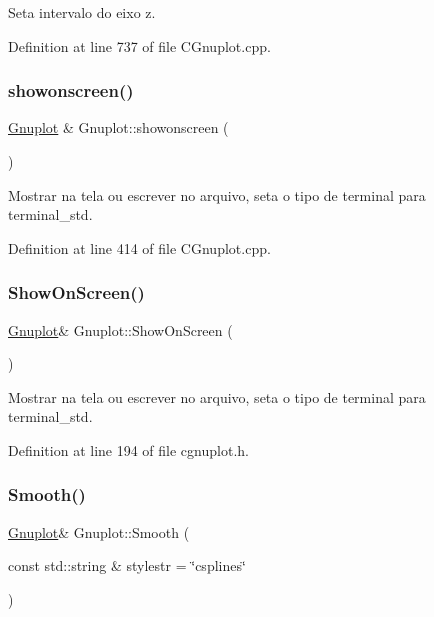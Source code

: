 Seta intervalo do eixo z. 



Definition at line 737 of file C\+Gnuplot.\+cpp.

\mbox{\label{class_gnuplot_a356d2faaa79f08d13fec9718b776b28d}} 
\subsubsection{\texorpdfstring{showonscreen()}{showonscreen()}}
{\footnotesize\ttfamily \hyperlink{class_gnuplot}{Gnuplot} \& Gnuplot\+::showonscreen (\begin{DoxyParamCaption}{ }\end{DoxyParamCaption})}



Mostrar na tela ou escrever no arquivo, seta o tipo de terminal para terminal\+\_\+std. 



Definition at line 414 of file C\+Gnuplot.\+cpp.

\mbox{\label{class_gnuplot_aee70cb6dfc893d6f19976fa9042c8e7c}} 
\subsubsection{\texorpdfstring{Show\+On\+Screen()}{ShowOnScreen()}}
{\footnotesize\ttfamily \hyperlink{class_gnuplot}{Gnuplot}\& Gnuplot\+::\+Show\+On\+Screen (\begin{DoxyParamCaption}{ }\end{DoxyParamCaption})\hspace{0.3cm}{\ttfamily [inline]}}



Mostrar na tela ou escrever no arquivo, seta o tipo de terminal para terminal\+\_\+std. 



Definition at line 194 of file cgnuplot.\+h.

\mbox{\label{class_gnuplot_aedd7a473c34c83b3b9ec1cea9891d0f2}} 
\subsubsection{\texorpdfstring{Smooth()}{Smooth()}\hspace{0.1cm}{\footnotesize\ttfamily [1/2]}}
{\footnotesize\ttfamily \hyperlink{class_gnuplot}{Gnuplot}\& Gnuplot\+::\+Smooth (\begin{DoxyParamCaption}\item[{const std\+::string \&}]{stylestr = {\ttfamily \char`\"{}csplines\char`\"{}} }\end{DoxyParamCaption})\hspace{0.3cm}{\ttfamily [inline]}}



